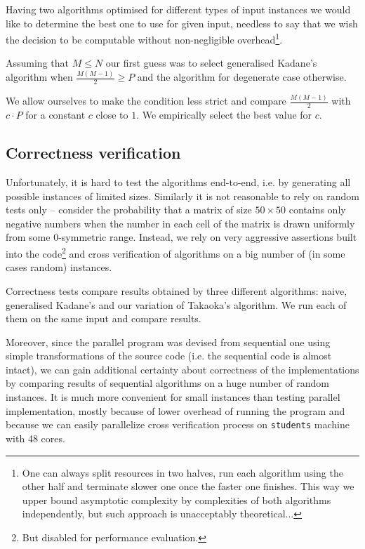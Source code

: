 Having two algorithms optimised for different types of input instances we would like to determine the best one to use for given input, needless to say that we wish the decision to be computable without non-negligible overhead\footnote{One can always split resources in two halves, run each algorithm using the other half and terminate slower one once the faster one finishes. This way we upper bound asymptotic complexity by complexities of both algorithms independently, but such approach is unacceptably theoretical...}.

Assuming that $M \leq N$ our first guess was to select generalised Kadane's algorithm when $\frac{M (M - 1)}{2} \geq P$ and the algorithm for degenerate case otherwise.

We allow ourselves to make the condition less strict and compare $\frac{M (M - 1)}{2}$ with $c \cdot P$ for a constant $c$ close to $1$.
We empirically select the best value for $c$.

\subsection*{Correctness verification}

Unfortunately, it is hard to test the algorithms end-to-end, i.e. by generating all possible instances of limited sizes.
Similarly it is not reasonable to rely on random tests only -- consider the probability that a matrix of size $50 \times 50$ contains only negative numbers when the number in each cell of the matrix is drawn uniformly from some $0$-symmetric range.
Instead, we rely on very aggressive assertions built into the code\footnote{But disabled for performance evaluation.} and cross verification of algorithms on a big number of (in some cases random) instances.

Correctness tests compare results obtained by three different algorithms: naive, generalised Kadane's and our variation of Takaoka's algorithm.
We run each of them on the same input and compare results.

Moreover, since the parallel program was devised from sequential one using simple transformations of the source code (i.e. the sequential code is almost intact), we can gain additional certainty about correctness of the implementations by comparing results of sequential algorithms on a huge number of random instances.
It is much more convenient for small instances than testing parallel implementation, mostly because of lower overhead of running the program and because we can easily parallelize cross verification process on \verb+students+ machine with 48 cores.

